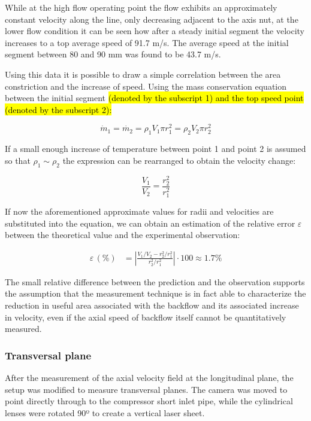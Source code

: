 While at the high flow operating point the flow exhibits an approximately constant velocity along the line, only decreasing adjacent to the axis nut, at the lower flow condition it can be seen how after a steady initial segment the velocity increases to a top average speed of 91.7 m/s. The average speed at the initial segment between 80 and 90 mm was found to be 43.7 m/s.

Using this data it is possible to draw a simple correlation between the area constriction and the increase of speed. Using the mass conservation equation between the initial segment \hl{(denoted by the subscript 1) and the top speed point (denoted by the subscript 2):}

\begin{equation}
  \dot{m}_1 = \dot{m_2} = \rho_1 V_1 \pi r_1^2 = \rho_2 V_2 \pi r_2^2
\end{equation}

If a small enough increase of temperature between point 1 and point 2 is assumed so that $\rho_1\sim\rho_2$ the expression can be rearranged to obtain the velocity change:

\begin{equation}
  \frac{V_1}{V_2} = \frac{r_2^2}{r_1^2}
\end{equation}

If now the aforementioned approximate values for radii and velocities are substituted into the equation, we can obtain an estimation of the relative error $\varepsilon$ between the theoretical value and the experimental observation:

\begin{align}
  \varepsilon\, (\%) &= \left|\frac{V_1/V_2-r_2^2/r_1^2}{r_2^2/r_1^2}\right| \cdot 100 \approx 1.7\%
\end{align}

The small relative difference between the prediction and the observation supports the assumption that the measurement technique is in fact able to characterize the reduction in useful area associated with the backflow and its associated increase in velocity, even if the axial speed of backflow itself cannot be quantitatively measured.

\subsubsection{Transversal plane}

After the measurement of the axial velocity field at the longitudinal plane, the setup was modified to measure transversal planes. The camera was moved to point directly through to the compressor short inlet pipe, while the cylindrical lenses were rotated 90º to create a vertical laser sheet.

